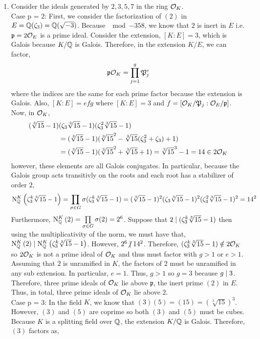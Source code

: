 \documentclass[12pt]{extarticle}
\begin{document}
\begin{enumerate}
\begin{enumerate}
\item Consider the ideals generated by $2,3,5,7$ in the ring  $\mathcal{O}_{K}$. \bigskip \\
Case p = 2: First, we consider the factorization of $(2)$ in $E = \mathbb{Q}(\zeta_3) = \mathbb{Q}(\sqrt{-3})$. Because $\mod{-3}{5}{8}$, we know that $2$ is inert in $E$ i.e. $\mathfrak{p} = 2 \mathcal{O}_{E}$ is a prime ideal.
Consider the extension, $[K : E] = 3$, which is Galois because $K/\mathbb{Q}$ is Galois. Therefore, in the extension $K/E$, we can factor,
\[ \mathfrak{p} \mathcal{O}_{K} = \prod_{j = 1}^g \mathfrak{P}_j^{e}\]
where the indices are the same for each prime factor because the extension is Galois. Also, $[K : E] = efg$ where $[K : E] = 3$ and $f = [\mathcal{O}_{K}/\mathfrak{P}_j : \mathcal{O}_{E}/\mathfrak{p}]$. Now, in $\mathcal{O}_{K}$, 
\begin{align*}
(\sqrt[3]{15} - 1)& ( \zeta_3 \sqrt[3]{15} - 1)(\zeta_3^2 \sqrt[3]{15} - 1) \\
& = (\sqrt[3]{15} - 1)(\sqrt[3]{15}^2 - \sqrt[3]{15} (\zeta_3^2 + \zeta_3) + 1) \\
& = (\sqrt[3]{15} - 1)(\sqrt[3]{15}^2 + \sqrt[3]{15} + 1) = \sqrt[3]{15}^3 - 1 = 14 \in 2 \mathcal{O}_{K}
\end{align*}
however, these elements are all Galois conjugates. In particular, because the Galois group acts transitivly on the roots and each root has a stabilizer of order $2$,
\[ \mathrm{N}^{K}_{\mathbb{Q}}\left(\zeta_3^k \sqrt[3]{15} - 1\right) = \prod_{\sigma \in G} \sigma(\zeta_3^k \sqrt[3]{15} - 1) = (\sqrt[3]{15} - 1)^2( \zeta_3 \sqrt[3]{15} - 1)^2(\zeta_3^2 \sqrt[3]{15} - 1)^2 = 14^2\]
Furthermore, $\mathrm{N}^{K}_{\mathbb{Q}}\left(2\right) = \prod\limits_{\sigma \in G} \sigma(2) = 2^6$. Suppose that $2 \mid (\zeta_3^k \sqrt[3]{15} - 1)$ then using the multiplicativity of the norm, we must have that, $\mathrm{N}^{K}_{\mathbb{Q}}\left(2\right) \mid \mathrm{N}^{K}_{\mathbb{Q}}\left(\zeta_3^k \sqrt[3]{15} - 1\right)$. However, $2^6 \ndivides 14^2$. Therefore, $(\zeta_3^k \sqrt[3]{15} - 1) \notin 2 \mathcal{O}_{K}$ so $2 \mathcal{O}_{K}$ is not a prime ideal of $\mathcal{O}_{K}$ and thus must factor with $g > 1$ or $e > 1$. Assuming that $2$ is unramified in $K$, the factors of $2$ must be unramified in any sub extension. In particular, $e = 1$. Thus, $g > 1$ so $g = 3$ because $g \mid 3$. Therefore, three prime ideals of $\mathcal{O}_{K}$ lie above $\mathfrak{p}$, the inert prime $(2)$ in $E$. Thus, in total, three prime ideals of $\mathcal{O}_{K}$ lie above $2$.       
\bigskip \\
Case p = 3: In the field $K$, we know that $(3)(5) = (15) = (\sqrt[3]{15})^3$. However, $(3)$ and $(5)$ are coprime so both $(3)$ and $(5)$ must be cubes. Because $K$ is a splitting field over $\mathbb{Q}$, the extension $K / \mathbb{Q}$ is Galois. Therefore, $(3)$ factors as,

\end{enumerate}
\end{enumerate}
\end{document}
